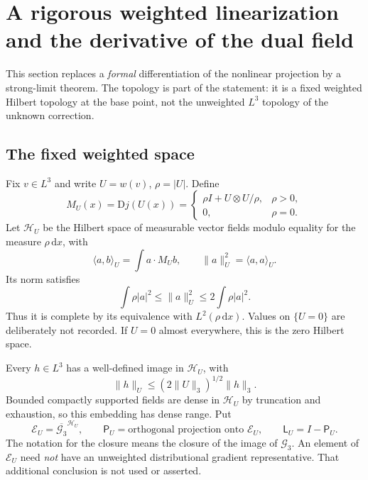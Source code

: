 \documentclass[11pt,a4paper]{article}
\theoremstyle{definition}\newtheorem{definition}[theorem]{Definition}
\theoremstyle{remark}\newtheorem{remark}[theorem]{Remark}
\newcommand{\G}{\mathcal G_3}
\newcommand{\HH}{\mathcal H}
\newcommand{\GG}{\mathcal E}
\newcommand{\LP}{\mathsf L}
\newcommand{\GP}{\mathsf P}
\newcommand{\dd}{\,\mathrm d}
\newcommand{\norm}[1]{\lVert #1\rVert}
\newcommand{\ip}[2]{\langle #1,#2\rangle}
\numberwithin{equation}{section}
\begin{document}
\section{A rigorous weighted linearization and the derivative of the dual field}
\label{sec:linear}
This section replaces a \emph{formal} differentiation of the nonlinear projection by a strong-limit theorem. The topology is part of the statement: it is a fixed weighted Hilbert topology at the base point, not the unweighted $L^3$ topology of the unknown correction.

\subsection{The fixed weighted space}
Fix $v\in L^3$ and write $U=w(v)$, $\rho=|U|$. Define
\begin{equation}\label{eq:matrixM}
 M_U(x)=\mathrm Dj(U(x))=
 \begin{cases}
 \rho I+U\otimes U/\rho,&\rho>0,\\
 0,&\rho=0.
 \end{cases}
\end{equation}
Let $\HH_U$ be the Hilbert space of measurable vector fields modulo equality for the measure $\rho\dd x$, with
\begin{equation}\label{eq:Hspace}
 \ip ab_U=\int a\cdot M_Ub,
 \qquad \norm a_U^2=\ip aa_U.
\end{equation}
Its norm satisfies
\begin{equation}\label{eq:Hequiv}
 \int\rho|a|^2\le\norm a_U^2\le2\int\rho|a|^2.
\end{equation}
Thus it is complete by its equivalence with $L^2(\rho\dd x)$. Values on $\{U=0\}$ are deliberately not recorded. If $U=0$ almost everywhere, this is the zero Hilbert space.

Every $h\in L^3$ has a well-defined image in $\HH_U$, with
\begin{equation}\label{eq:L3embed}
 \norm h_U\le(2\norm U_3)^{1/2}\norm h_3.
\end{equation}
Bounded compactly supported fields are dense in $\HH_U$ by truncation and exhaustion, so this embedding has dense range. Put
\begin{equation}\label{eq:weightedE}
 \GG_U=\overline{\G}^{\HH_U},\qquad
 \GP_U=\text{orthogonal projection onto }\GG_U,
 \qquad \LP_U=I-\GP_U.
\end{equation}
The notation for the closure means the closure of the image of $\G$. An element of $\GG_U$ need \emph{not} have an unweighted distributional gradient representative. That additional conclusion is not used or asserted.
\end{document}
